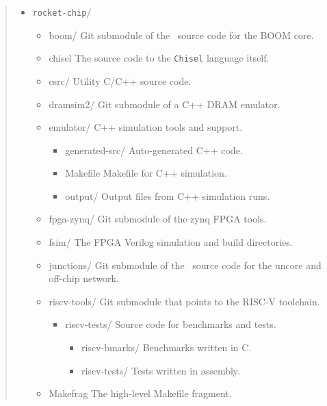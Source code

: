\begin{quote}
\begin{itemize}
\item \verb=rocket-chip=/\begin{itemize}

  \item boom/ {\footnotesize \color{red} Git submodule of the \Chisel\ source code for the BOOM core.}
  \item chisel {\footnotesize \color{red}  The source code to the {\tt Chisel} language itself.}
  \item csrc/ {\footnotesize \color{red} Utility C/C++ source code.}
  \item dramsim2/ {\footnotesize \color{red} Git submodule of a C++ DRAM emulator.}
  
  \item emulator/ {\footnotesize \color{red} C++ simulation tools and support.}\begin{itemize}
    \item generated-src/{\footnotesize \color{red} Auto-generated C++ code.} 
    \item Makefile {\footnotesize \color{red} Makefile for C++ simulation.}
    \item output/{\footnotesize \color{red} Output files from C++ simulation runs.} 
    \end{itemize}
  \item fpga-zynq/ {\footnotesize \color{red} Git submodule of the zynq FPGA tools.}
  \item fsim/ {\footnotesize \color{red} The FPGA Verilog simulation and build directories. }
  \item junctions/ {\footnotesize \color{red} Git submodule of the \Chisel\ source code for the uncore and off-chip network.}
 \item riscv-tools/{\footnotesize \color{red} Git submodule that points to the RISC-V toolchain.}
 \begin{itemize} 
  \item riscv-tests/ {\footnotesize \color{red} Source code for benchmarks and tests.} \begin{itemize}
    \item riscv-bmarks/ {\footnotesize \color{red}  Benchmarks written in C.}
    \item riscv-tests/ {\footnotesize \color{red}  Tests written in assembly.}
  \end{itemize}
  \end{itemize}
   \item Makefrag {\footnotesize \color{red}  The high-level Makefile fragment.}
   

\end{itemize}
\end{itemize}
\end{quote}
